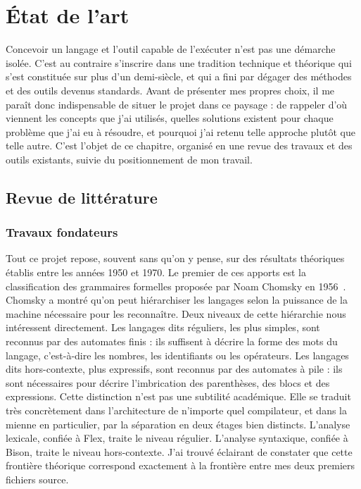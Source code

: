 \chapter{État de l'art}
\label{chap:etat}

Concevoir un langage et l'outil capable de l'exécuter n'est pas une démarche
isolée. C'est au contraire s'inscrire dans une tradition technique et théorique
qui s'est constituée sur plus d'un demi-siècle, et qui a fini par dégager des
méthodes et des outils devenus standards. Avant de présenter mes propres choix,
il me paraît donc indispensable de situer le projet dans ce paysage : de rappeler
d'où viennent les concepts que j'ai utilisés, quelles solutions existent pour
chaque problème que j'ai eu à résoudre, et pourquoi j'ai retenu telle approche
plutôt que telle autre. C'est l'objet de ce chapitre, organisé en une revue des
travaux et des outils existants, suivie du positionnement de mon travail.

\section{Revue de littérature}

\subsection{Travaux fondateurs}

Tout ce projet repose, souvent sans qu'on y pense, sur des résultats théoriques
établis entre les années 1950 et 1970. Le premier de ces apports est la
classification des grammaires formelles proposée par Noam Chomsky en
1956~\cite{chomsky}. Chomsky a montré qu'on peut hiérarchiser les langages selon
la puissance de la machine nécessaire pour les reconnaître. Deux niveaux de cette
hiérarchie nous intéressent directement. Les langages dits réguliers, les plus
simples, sont reconnus par des automates finis : ils suffisent à décrire la forme
des mots du langage, c'est-à-dire les nombres, les identifiants ou les
opérateurs. Les langages dits hors-contexte, plus expressifs, sont reconnus par
des automates à pile : ils sont nécessaires pour décrire l'imbrication des
parenthèses, des blocs et des expressions. Cette distinction n'est pas une
subtilité académique. Elle se traduit très concrètement dans l'architecture de
n'importe quel compilateur, et dans la mienne en particulier, par la séparation
en deux étages bien distincts. L'analyse lexicale, confiée à Flex, traite le
niveau régulier. L'analyse syntaxique, confiée à Bison, traite le niveau
hors-contexte. J'ai trouvé éclairant de constater que cette frontière théorique
correspond exactement à la frontière entre mes deux premiers fichiers source.

